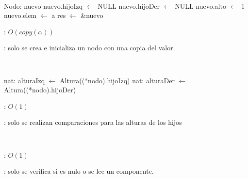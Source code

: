 \begin{Algoritmos}
	~

	\begin{algorithm}[H]
		\NoCaptionOfAlgo
		\caption{}
		\BlankLine
		Nodo: nuevo
		nuevo.hijoIzq $\leftarrow$ NULL
		nuevo.hijoDer $\leftarrow$ NULL
		nuevo.alto $\leftarrow$ 1
		nuevo.elem $\leftarrow$ a
		res $\leftarrow$ \&nuevo
	\end{algorithm}
	
	\complejidad: $O(copy(\alpha))$

	\justifcomp: solo se crea e inicializa un nodo con una copia del valor.

	~

	\begin{algorithm}[H]
		\NoCaptionOfAlgo
		\caption{}
		\BlankLine
		nat: alturaIzq $\leftarrow$ Altura((*nodo).hijoIzq)
		nat: alturaDer $\leftarrow$ Altura((*nodo).hijoDer)
	\end{algorithm}
	
	\complejidad: $O(1)$

	\justifcomp: solo se realizan comparaciones para las alturas de los hijos

	~

	\begin{algorithm}[H]
		\NoCaptionOfAlgo
		\caption{}
		\BlankLine
	\end{algorithm}
	
	\complejidad: $O(1)$

	\justifcomp: solo se verifica si es nulo o se lee un componente.

	~


\end{Algoritmos}
